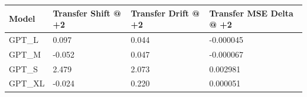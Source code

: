 \begin{tabular}{llll}
\toprule
Model & Transfer Shift @ +2 & Transfer Drift @ +2 & Transfer MSE Delta @ +2 \\
\midrule
GPT\_L & 0.097 & 0.044 & -0.000045 \\
GPT\_M & -0.052 & 0.047 & -0.000067 \\
GPT\_S & 2.479 & 2.073 & 0.002981 \\
GPT\_XL & -0.024 & 0.220 & 0.000051 \\
\bottomrule
\end{tabular}
